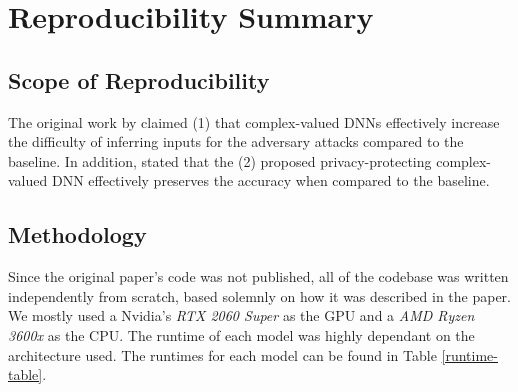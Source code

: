 \section*{\centering Reproducibility Summary}


\subsection*{Scope of Reproducibility}
The original work by  \cite{xiang2020interpretable} claimed (1) that complex-valued DNNs effectively increase the difficulty of inferring inputs for the adversary attacks compared to the baseline. 
In addition, \cite{xiang2020interpretable} stated that the (2) proposed privacy-protecting complex-valued DNN effectively preserves the accuracy when compared to the baseline.

\subsection*{Methodology}


Since the original paper's code was not published, all of the codebase was written independently from scratch, based solemnly on how it was described in the paper. We mostly used a Nvidia's \textit{RTX 2060 Super} as the GPU and a \textit{AMD Ryzen 3600x} as the CPU.  The runtime of each model was highly dependant on the architecture used. The runtimes for each model can be found in Table \ref{runtime-table}.

